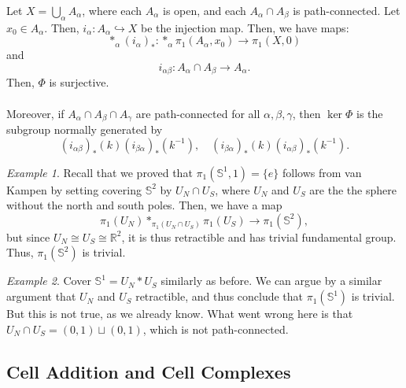 \documentclass[a4paper]{report}
\theoremstyle{definition}
\theoremstyle{remark}
\theoremstyle{proposition}
\theoremstyle{conjecture}
\theoremstyle{lemma}
\theoremstyle{corollary}
\theoremstyle{exercise}
\newtheorem{example}{Example}
\begin{document}
\begin{theorem}
    Let $X = \bigcup_\alpha A_\alpha$, where each $A_\alpha$ is open,
    and each $A_\alpha \cap A_\beta$ is path-connected. Let 
    $x_0 \in A_\alpha$. 
    Then, $i_\alpha : A_\alpha \hookrightarrow X$ be the injection map.
    Then, we have maps: $$\ast_\alpha (i_\alpha)_\ast : \ast_\alpha \pi_1(A_\alpha,x_0) \longrightarrow \pi_1(X,0)$$
    and $$i_{\alpha\beta}: A_\alpha \cap A_\beta \longrightarrow A_\alpha.$$
    Then, $\Phi$ is surjective.\\\\
    Moreover, if $A_\alpha \cap A_\beta \cap A_\gamma$ are path-connected
    for all $\alpha,\beta,\gamma$, then $\ker\Phi$ is the subgroup normally
    generated by 
    $$(i_{\alpha\beta})_\ast(k) (i_{\beta\alpha})_\ast(k^{-1}), \quad (i_{\beta\alpha})_\ast(k) (i_{\alpha\beta})_\ast(k^{-1}).$$
\end{theorem}

\begin{example}
    Recall that we proved that $\pi_1(\mathbb{S}^1,1) = \lbrace e\rbrace$
    follows from van Kampen by setting covering $\mathbb{S}^2$ by 
    $U_N \cap U_S$, where $U_N$ and $U_S$ are the the sphere without 
    the north and south poles. 
    Then, we have a map 
    $$\pi_1(U_N) \ast_{\pi_1(U_N \cap U_S)} \pi_1(U_S) \longrightarrow \pi_1(\mathbb{S}^2),$$
    but since $U_N \cong U_S \cong \mathbb{R}^2$, it is thus retractible
    and has trivial fundamental group. 
    Thus, $\pi_1(\mathbb{S}^2)$ is trivial.
\end{example}

\begin{example}
    Cover $\mathbb{S}^1 = U_N \ast U_S$ similarly as before.
    We can argue by a similar argument that $U_N$ and $U_S$ 
    retractible, and thus conclude that $\pi_1(\mathbb{S}^1)$ is trivial.
    But this is not true, as we already know. 
    What went wrong here is that $U_N \cap U_S = (0,1) \sqcup (0,1)$, 
    which is not path-connected.
\end{example}

\subsection{Cell Addition and Cell Complexes}
\end{document}
